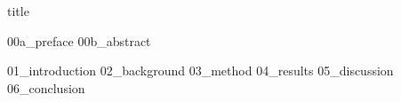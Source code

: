 \documentclass[12pt]{article}
\begin{document}
{title}


\frontmatter

{00a_preface}
{00b_abstract}

\tableofcontents

\listoftables

\mainmatter

{01_introduction}
{02_background}
{03_method}
{04_results}
{05_discussion}
{06_conclusion}



\newpage
\printbibliography[heading = bibintoc, title = Bibliography]    %


\end{document}
